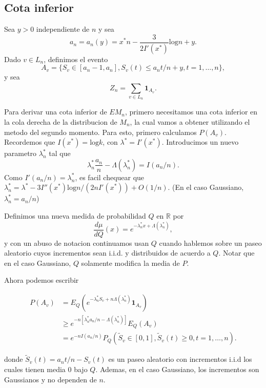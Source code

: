 \documentclass[12pt]{report}
\begin{document}
\subsection{Cota inferior}

Sea $y>0$ independiente de $n$ y sea
\[
a_n = a_n(y) = x^*n - \frac{3}{2I'(x^*)} \text{log} n + y.
\]
Dado $v \in L_n$, definimos el evento
\[
A_v = \{ S_v \in [a_n-1,a_n], S_v(t)\leq a_n t / n + y, t = 1, \dots, n \},
\]
y sea
\[
Z_n = \sum_{v \in L_n}^{} \mathbf{1}_{A_v}.
\]

Para derivar una cota inferior de $EM_n$, primero necesitamos una cota inferior en la
cola derecha de la distribucion de $M_n$, la cual vamos a obtener utilizando el metodo del segundo momento. 
Para esto, primero calculamos $P(A_v)$. Recordemos que $I(x^*) = \text{log} k$, con $\lambda^*=I'(x^*)$. 
Introducimos un nuevo parametro $\lambda_{n}^{*}$ tal que
\[
\lambda_{n}^{*}\frac{a_n}{n}-\varLambda(\lambda_{n}^{*}) = I(a_n/n).
\]
Como $I'(a_n/n) = \lambda_{n}^{*}$, es facil chequear que $\lambda_{n}^{*} = 
\lambda^* - 3I''(x^*) \text{log}n/(2nI'(x^*)) + O(1/n)$. (En el caso Gaussiano, $\lambda_{n}^{*} = a_n / n $)

Definimos una nueva medida de probabilidad $Q$ en $\mathbb{R}$ por
\[
\frac{d\mu}{dQ}(x) = e^{-\lambda_{n}^{*}x + \varLambda(\lambda_{n}^{*})},
\]
y con un abuso de notacion continuamos usan $Q$ cuando hablemos sobre un paseo aleatorio 
cuyos incrementos sean i.i.d. y distribuidos de acuerdo a $Q$. Notar que en el caso Gaussiano, 
$Q$ solamente modifica la media de $P$.

\par Ahora podemos escribir 

\begin{align}
P(A_v) &= E_Q (e^{-\lambda_n^* S_v + n \Lambda(\lambda_n^*)} \mathbf{1}_{A_v}) \nonumber \\
&\geq e^{-n [\lambda_n^* a_n/n - \Lambda(\lambda_n^*)]} E_Q(A_v) \\
&= e^{-n I(a_n/n)} P_Q ( \tilde{S}_v \in [0,1], \tilde{S}_v (t) \geq 0, t = 1, \dots, n ). \nonumber 
\end{align}

donde $\tilde{S}_v (t) = a_n t / n - S_v (t)$ es un paseo aleatorio con incrementos i.i.d los cuales tienen media $0$ bajo $Q$. 
Ademas, en el caso Gaussiano, los incrementos son Gaussianos y no dependen de $n$.
\end{document}
